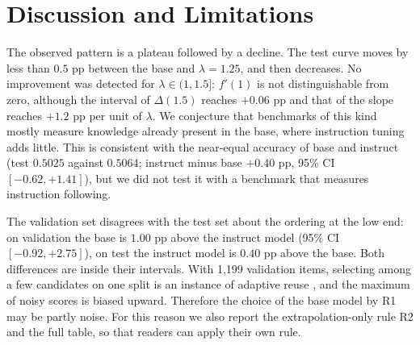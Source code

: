 \documentclass[conference]{IEEEtran}
\begin{document}
\section{Discussion and Limitations}
The observed pattern is a plateau followed by a decline. The test curve moves by less than $0.5$ pp between the base and $\lambda=1.25$, and then decreases. No improvement was detected for $\lambda\in(1,1.5]$: $f'(1)$ is not distinguishable from zero, although the interval of $\Delta(1.5)$ reaches $+0.06$ pp and that of the slope reaches $+1.2$ pp per unit of $\lambda$. We conjecture that benchmarks of this kind mostly measure knowledge already present in the base, where instruction tuning adds little. This is consistent with the near-equal accuracy of base and instruct (test $0.5025$ against $0.5064$; instruct minus base $+0.40$ pp, 95\% CI $[-0.62,+1.41]$), but we did not test it with a benchmark that measures instruction following.

The validation set disagrees with the test set about the ordering at the low end: on validation the base is $1.00$ pp above the instruct model (95\% CI $[-0.92,+2.75]$), on test the instruct model is $0.40$ pp above the base. Both differences are inside their intervals. With 1{,}199 validation items, selecting among a few candidates on one split is an instance of adaptive reuse \cite{dwork2015reusable}, and the maximum of noisy scores is biased upward. Therefore the choice of the base model by R1 may be partly noise. For this reason we also report the extrapolation-only rule R2 and the full table, so that readers can apply their own rule.
\end{document}
